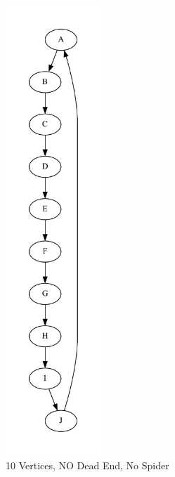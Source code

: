 \documentclass{article}
\begin{document}
\begin{figure}
  \centering
  \includegraphics[width=0.32\textwidth]{graph2.pdf}
  \caption{10 Vertices, NO Dead End, No Spider}
  \label{fig:image_label}
\end{figure}
\end{document}
